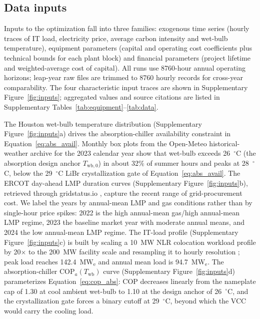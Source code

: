 \documentclass[sn-vancouver,Numbered]{sn-jnl}%
\begin{document}
\subsection{Data inputs}
\label{sec:methods:data}

Inputs to the optimization fall into three families: exogenous time series (hourly traces of IT load, electricity price, average carbon intensity and wet-bulb temperature), equipment parameters (capital and operating cost coefficients plus technical bounds for each plant block) and financial parameters (project lifetime and weighted-average cost of capital). All runs use 8760-hour annual operating horizons; leap-year raw files are trimmed to 8760 hourly records for cross-year comparability. The four characteristic input traces are shown in Supplementary Figure~\ref{fig:inputs}; aggregated values and source citations are listed in Supplementary Tables~\ref{tab:equipment}--\ref{tab:data}.

The Houston wet-bulb temperature distribution (Supplementary Figure~\ref{fig:inputs}a) drives the absorption-chiller availability constraint in Equation~\eqref{eq:abs_avail}. Monthly box plots from the Open-Meteo historical-weather archive \citep{openmeteo2023} for the 2023 calendar year show that wet-bulb exceeds 26~$^\circ$C (the absorption design anchor $T_{\mathrm{wb},0}$) in about 32\% of summer hours and peaks at 28~$^\circ$C, below the 29~$^\circ$C LiBr crystallization gate of Equation~\eqref{eq:abs_avail}. The ERCOT day-ahead LMP duration curves (Supplementary Figure~\ref{fig:inputs}b), retrieved through gridstatus.io \citep{gridstatus}, capture the recent range of grid-procurement cost. We label the years by annual-mean LMP and gas conditions rather than by single-hour price spikes: 2022 is the high annual-mean gas/high annual-mean LMP regime, 2023 the baseline market year with moderate annual means, and 2024 the low annual-mean LMP regime. The IT-load profile (Supplementary Figure~\ref{fig:inputs}c) is built by scaling a 10~MW NLR colocation workload profile by 20$\times$ to the 200~MW facility scale and resampling it to hourly resolution \citep{vercellino2026aiworkload}; peak load reaches 142.4~MW$_\mathrm{e}$ and annual mean load is 94.7~MW$_\mathrm{e}$. The absorption-chiller COP$_a(T_{\mathrm{wb}})$ curve (Supplementary Figure~\ref{fig:inputs}d) parameterizes Equation~\eqref{eq:cop_abs}: COP decreases linearly from the nameplate cap of 1.30 at cool ambient wet-bulb to 1.10 at the design anchor of 26~$^\circ$C, and the crystallization gate forces a binary cutoff at 29~$^\circ$C, beyond which the VCC would carry the cooling load.
\end{document}
